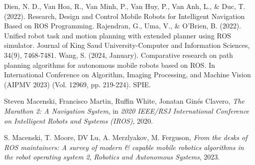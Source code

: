 \documentclass[sigconf]{acmart}
\begin{document}
\begin{thebibliography}{00}
Dien, N. D., Van Hoa, R., Van Minh, P., Van Huy, P., Van Anh, L., \& Duc, T. (2022). Research, Design and Control Mobile Robots for Intelligent Navigation Based on ROS Programming.
Rajendran, G., Uma, V., \& O’Brien, B. (2022). Unified robot task and motion planning with extended planner using ROS simulator. Journal of King Saud University-Computer and Information Sciences, 34(9), 7468-7481.
Wang, S. (2024, January). Comparative research on path planning algorithms for autonomous mobile robots based on ROS. In International Conference on Algorithm, Imaging Processing, and Machine Vision (AIPMV 2023) (Vol. 12969, pp. 219-224). SPIE.





Steven Macenski, Francisco Martin, Ruffin White, Jonatan Ginés Clavero,
\emph{The Marathon 2: A Navigation System},
in \emph{2020 IEEE/RSJ International Conference on Intelligent Robots and Systems (IROS)},
2020.

S. Macenski, T. Moore, DV Lu, A. Merzlyakov, M. Ferguson,
\emph{From the desks of ROS maintainers: A survey of modern \& capable mobile robotics algorithms in the robot operating system 2},
\emph{Robotics and Autonomous Systems},
2023.





\end{thebibliography}


\appendix




\end{document}
